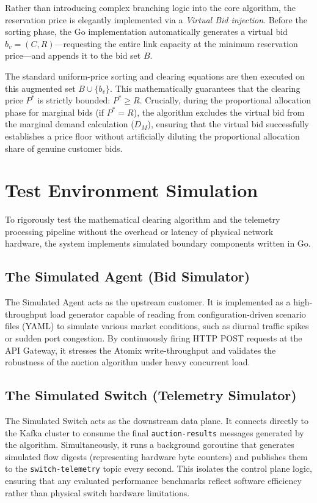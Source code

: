 Rather than introducing complex branching logic into the core algorithm, the reservation price is elegantly implemented via a \textit{Virtual Bid injection}. Before the sorting phase, the Go implementation automatically generates a virtual bid $b_v = (C, R)$—requesting the entire link capacity at the minimum reservation price—and appends it to the bid set $B$.

The standard uniform-price sorting and clearing equations are then executed on this augmented set $B \cup \{b_v\}$. This mathematically guarantees that the clearing price $P^*$ is strictly bounded: $P^* \ge R$. Crucially, during the proportional allocation phase for marginal bids (if $P^* = R$), the algorithm excludes the virtual bid from the marginal demand calculation ($D_M$), ensuring that the virtual bid successfully establishes a price floor without artificially diluting the proportional allocation share of genuine customer bids.

\section{Test Environment Simulation}

To rigorously test the mathematical clearing algorithm and the telemetry processing pipeline without the overhead or latency of physical network hardware, the system implements simulated boundary components written in Go.

\subsection{The Simulated Agent (Bid Simulator)}
The Simulated Agent acts as the upstream customer. It is implemented as a high-throughput load generator capable of reading from configuration-driven scenario files (YAML) to simulate various market conditions, such as diurnal traffic spikes or sudden port congestion. By continuously firing HTTP POST requests at the API Gateway, it stresses the Atomix write-throughput and validates the robustness of the auction algorithm under heavy concurrent load.

\subsection{The Simulated Switch (Telemetry Simulator)}
The Simulated Switch acts as the downstream data plane. It connects directly to the Kafka cluster to consume the final \texttt{auction-results} messages generated by the algorithm. Simultaneously, it runs a background goroutine that generates simulated flow digests (representing hardware byte counters) and publishes them to the \texttt{switch-telemetry} topic every second. This isolates the control plane logic, ensuring that any evaluated performance benchmarks reflect software efficiency rather than physical switch hardware limitations.


